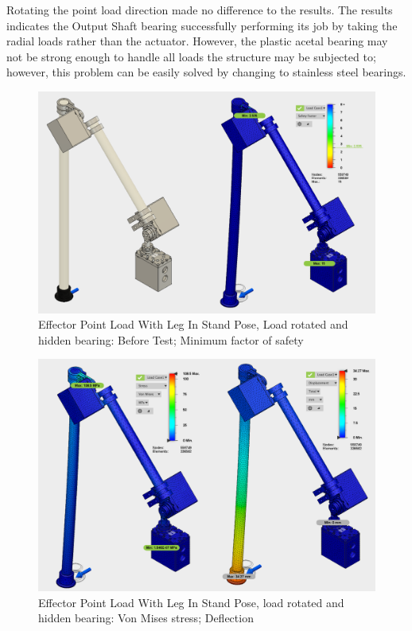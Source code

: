 Rotating the point load direction made no difference to the results. 
The results indicates the Output Shaft bearing successfully performing its job by taking the radial loads rather than the actuator. However, the plastic acetal bearing may not be strong enough to handle all loads the structure may be subjected to; however, this problem can be easily solved by changing to stainless steel bearings. 


 
\begin{figure}
\centering
\includegraphics[width=1.0\columnwidth]{./img/aquaShoko-v3dot3-FEA-HidenBearing-1.png}
\caption{Effector Point Load With Leg In Stand Pose, Load rotated and hidden bearing: Before Test; Minimum factor of safety }
\label{fig:FEA EE factor of safety no bearing}
\end{figure}

\begin{figure}
\centering
\includegraphics[width=1.0\columnwidth]{./img/aquaShoko-v3dot3-FEA-HidenBearing-2.png}
\caption{Effector Point Load With Leg In Stand Pose, load rotated and hidden bearing: Von Mises stress; Deflection}
\label{fig:FEA EE defection no bearing}
\end{figure}











